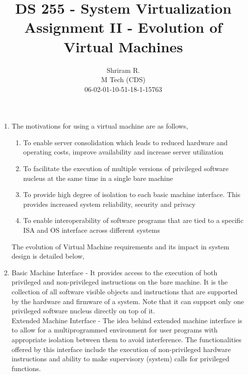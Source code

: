 \documentclass[11pt,a4paper,oneside]{article}
\begin{document}
	\title{DS 255 - System Virtualization \\ Assignment II - Evolution of Virtual Machines}
	\author{Shriram R. \\ M Tech (CDS) \\ 06-02-01-10-51-18-1-15763}
	\maketitle	
	
	\begin{enumerate}
		\item The motivations for using a virtual machine are as follows,
			  \begin{enumerate}
			  	\item To enable server consolidation which leads to reduced hardware and operating costs, improve availability and increase server utilization 
			  	\item To facilitate the execution of multiple versions of privileged software nucleus at the same time in a single bare machine
			  	\item To provide high degree of isolation to each basic machine interface. This provides increased system reliability, security and privacy
			  	\item To enable interoperability of software programs that are tied to a specific ISA and OS interface across different systems
			  \end{enumerate}
		      The evolution of Virtual Machine requirements and its impact in system design is detailed below,
		      
		\item Basic Machine Interface - It provides access to the execution of both privileged and non-privileged instructions on the bare machine. It is the collection of all software visible objects and instructions that are supported by the hardware and firmware of a system. Note that it can support only one privileged software nucleus directly on top of it.\\
		
		      Extended Machine Interface - The idea behind extended machine interface is to allow for a multiprogrammed environment for user programs with appropriate isolation between them to avoid interference.  The functionalities offered by this interface include the execution of non-privileged hardware instructions and ability to make supervisory (system) calls for privileged functions. \\
		      

\end{enumerate}
\end{document}
